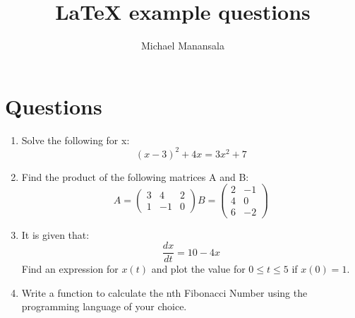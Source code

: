 \documentclass[11pt, a4paper]{article}
\title{LaTeX example questions}
\author{Michael Manansala}
\begin{document}
	
	\maketitle
	
	\section{Questions}
	\begin{enumerate}
		\item Solve the following for x:\\ %
		\begin{equation*} %
		(x-3)^2+4x=3x^2+7
		\end{equation*}
		\item Find the product of the following matrices A and B:\\
		\begin{equation*}
		A=\begin{pmatrix}
		3 & 4 & 2 \\
		1 & -1 & 0
		\end{pmatrix}
		B=\begin{pmatrix}
		2 & -1 \\
		4 & 0  \\
		6 & -2
		\end{pmatrix}
		\end{equation*}
		\item It is given that:\\
		\begin{equation*}
		\frac{dx}{dt}=10-4x
		\end{equation*}
		Find an expression for $x(t)$ and plot the value for $0\leq t\leq 5$ if $x(0)=1$.
		\item Write a function to calculate the nth Fibonacci Number using the programming language of your choice.
	\end{enumerate}
	
\end{document}

